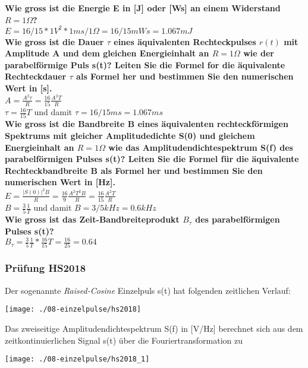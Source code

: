 \textbf{Wie gross ist die Energie E in [J] oder [Ws] an einem Widerstand $R = 1 \Omega$?}\\
$E = 16/15 * 1 V^2 * 1ms / 1 \Omega = 16/15 mWs = 1.067 mJ$\\

\textbf{Wie gross ist die Dauer $\tau$ eines äquivalenten Rechteckpulses $r(t)$ mit Amplitude A und dem gleichen Energieinhalt an $R = 1 \Omega$ wie der parabelförmige Puls s(t)? Leiten Sie die Formel for die äquivalente Rechteckdauer $\tau $ als Formel her und bestimmen Sie den numerischen Wert in [s].}\\
$A=\frac{A^2\tau}{R}=\frac{16}{15}\frac{A^2T}{R}$\\
$\tau = \frac{16}{15}T$ und damit $\tau =16/15 ms = 1.067ms$\\

\textbf{Wie gross ist die Bandbreite B eines äquivalenten rechteckförmigen Spektrums mit gleicher Amplitudedichte S(0) und gleichem Energieinhalt an $R = 1 \Omega$ wie das Amplitudendichtespektrum S(f) des parabelförmigen Pulses s(t)? Leiten Sie die Formel für die äquivalente Rechteckbandbreite B als Formel her und bestimmen Sie den numerischen Wert in [Hz].}\\
$E=\frac{|S(0)|^2B}{R}=\frac{16}{9}\frac{A^2T^2B}{R}=\frac{16}{15}\frac{A^2T}{R}$\\
$B=\frac{3}{5}\frac{1}{T}$ und damit $B=3/5 kHz=0.6kHz$\\

\textbf{Wie gross ist das Zeit-Bandbreiteprodukt $B_{\tau }$ des parabelförmigen Pulses s(t)?}\\
$B_{\tau }=\frac{3}{5}\frac{1}{T}*\frac{16}{15}T=\frac{16}{25}=0.64$

\subsubsection{Prüfung HS2018}
Der sogenannte \textit{Raised-Cosine} Einzelpuls s(t) hat folgenden zeitlichen Verlauf:
\begin{center}
    \vspace{-8pt}
    \texttt{[image: ./08-einzelpulse/hs2018]}
    \vspace{-8pt}
\end{center}

Das zweiseitige Amplitudendichtespektrum S(f) in [V/Hz] berechnet sich aus dem zeitkontinuierlichen Signal s(t) über die Fouriertransformation zu
\begin{center}
    \vspace{-8pt}
    \texttt{[image: ./08-einzelpulse/hs2018\_1]}
    \vspace{-8pt}
\end{center}

